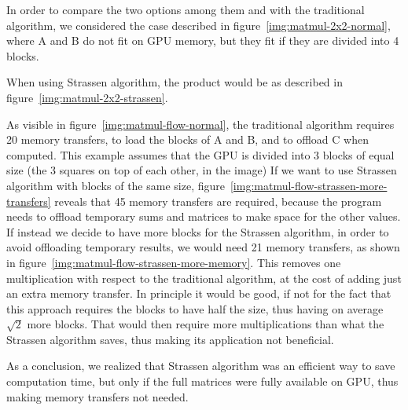 In order to compare the two options among them and with the traditional algorithm, we considered the case described in figure~\ref{img:matmul-2x2-normal}, where A and B do not fit on GPU memory, but they fit if they are divided into 4 blocks.

When using Strassen algorithm, the product would be as described in figure~\ref{img:matmul-2x2-strassen}.

As visible in figure~\ref{img:matmul-flow-normal}, the traditional algorithm requires 20 memory transfers, to load the blocks of A and B, and to offload C when computed.
This example assumes that the GPU is divided into 3 blocks of equal size (the 3 squares on top of each other, in the image)
If we want to use Strassen algorithm with blocks of the same size, figure~\ref{img:matmul-flow-strassen-more-transfers} reveals that 45 memory transfers are required, because the program needs to offload temporary sums and matrices to make space for the other values.
If instead we decide to have more blocks for the Strassen algorithm, in order to avoid offloading temporary results, we would need 21 memory transfers, as shown in figure~\ref{img:matmul-flow-strassen-more-memory}.
This removes one multiplication with respect to the traditional algorithm, at the cost of adding just an extra memory transfer.
In principle it would be good, if not for the fact that this approach requires the blocks to have half the size, thus having on average $\sqrt{2}$ more blocks.
That would then require more multiplications than what the Strassen algorithm saves, thus making its application not beneficial.

As a conclusion, we realized that Strassen algorithm was an efficient way to save computation time, but only if the full matrices were fully available on GPU, thus making memory transfers not needed.
